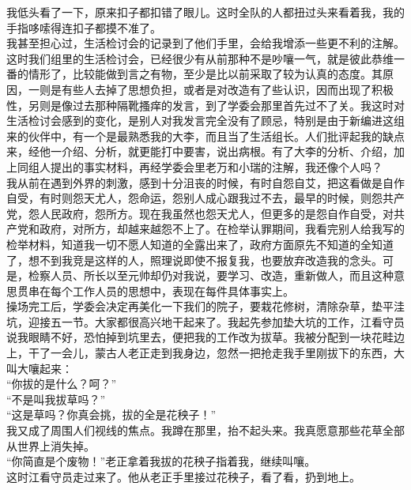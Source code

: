 我低头看了一下，原来扣子都扣错了眼儿。这时全队的人都扭过头来看着我，我的手指哆嗦得连扣子都摸不准了。\\

我甚至担心过，生活检讨会的记录到了他们手里，会给我增添一些更不利的注解。这时我们组里的生活检讨会，已经很少有从前那种不是吵嚷一气，就是彼此恭维一番的情形了，比较能做到言之有物，至少是比以前采取了较为认真的态度。其原因，一则是有些人去掉了思想负担，或者是对改造有了些认识，因而出现了积极性，另则是像过去那种隔靴搔痒的发言，到了学委会那里首先过不了关。我这时对生活检讨会感到的变化，是别人对我发言完全没有了顾忌，特别是由于新编进这组来的伙伴中，有一个是最熟悉我的大李，而且当了生活组长。人们批评起我的缺点来，经他一介绍、分析，就更能打中要害，说出病根。有了大李的分析、介绍，加上同组人提出的事实材料，再经学委会里老万和小瑞的注解，我还像个人吗？\\

我从前在遇到外界的刺激，感到十分沮丧的时候，有时自怨自艾，把这看做是自作自受，有时则怨天尤人，怨命运，怨别人成心跟我过不去，最早的时候，则怨共产党，怨人民政府，怨所方。现在我虽然也怨天尤人，但更多的是怨自作自受，对共产党和政府，对所方，却越来越怨不上了。在检举认罪期间，我看完别人给我写的检举材料，知道我一切不愿人知道的全露出来了，政府方面原先不知道的全知道了，想不到我竞是这样的人，照理说即使不报复我，也要放弃改造我的念头。可是，检察人员、所长以至元帅却仍对我说，要学习、改造，重新做人，而且这种意思贯串在每个工作人员的思想中，表现在每件具体事实上。\\

操场完工后，学委会决定再美化一下我们的院子，要栽花修树，清除杂草，垫平洼坑，迎接五一节。大家都很高兴地干起来了。我起先参加垫大坑的工作，江看守员说我眼睛不好，恐怕掉到坑里去，便把我的工作改为拔草。我被分配到一块花畦边上，干了一会儿，蒙古人老正走到我身边，忽然一把抢走我手里刚拔下的东西，大叫大嚷起来：\\

“你拔的是什么？呵？”\\

“不是叫我拔草吗？”\\

“这是草吗？你真会挑，拔的全是花秧子！”\\

我又成了周围人们视线的焦点。我蹲在那里，抬不起头来。我真愿意那些花草全部从世界上消失掉。\\

“你简直是个废物！”老正拿着我拔的花秧子指着我，继续叫嚷。\\

这时江看守员走过来了。他从老正手里接过花秧子，看了看，扔到地上。\\

